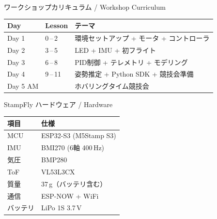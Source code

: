 \documentclass[aspectratio=169, 14pt]{beamer}
\begin{document}

\begin{frame}{ワークショップカリキュラム / Workshop Curriculum}
  \begin{table}
    \centering
    \begin{tabular}{lll}
      \hline
      \textbf{Day} & \textbf{Lesson} & \textbf{テーマ} \\
      \hline
      Day 1    & 0\,--\,2   & 環境セットアップ + モータ + コントローラ \\
      Day 2    & 3\,--\,5   & LED + IMU + 初フライト \\
      Day 3    & 6\,--\,8   & PID制御 + テレメトリ + モデリング \\
      Day 4    & 9\,--\,11  & 姿勢推定 + Python SDK + 競技会準備 \\
      Day 5 AM &            & ホバリングタイム競技会 \\
      \hline
    \end{tabular}
  \end{table}
\end{frame}

\begin{frame}{StampFly ハードウェア / Hardware}
  \begin{table}
    \centering
    \begin{tabular}{ll}
      \hline
      \textbf{項目} & \textbf{仕様} \\
      \hline
      MCU    & ESP32-S3 (M5Stamp S3) \\
      IMU    & BMI270 (6軸 400\,Hz) \\
      気圧   & BMP280 \\
      ToF    & VL53L3CX \\
      質量   & 37\,g（バッテリ含む） \\
      通信   & ESP-NOW + WiFi \\
      バッテリ & LiPo 1S 3.7\,V \\
      \hline
    \end{tabular}
  \end{table}
\end{frame}
\end{document}
